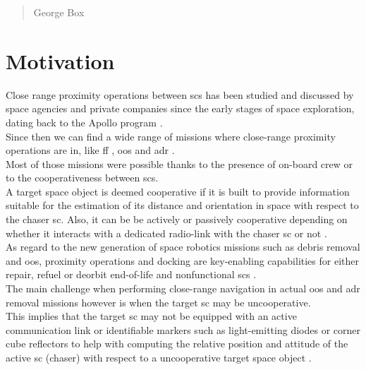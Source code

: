 \begin{quotation}
{\footnotesize
{}
\begin{flushright}
George Box
\end{flushright}
}
\end{quotation}
\vspace{0.5cm}

\section{Motivation}
Close range proximity operations between \acrfull{sc}s has been studied and discussed by space agencies and private companies since the early stages of space exploration, dating back to the Apollo program \cite{LangleyApollo}.\\
Since then we can find a wide range of missions where close-range proximity operations are in, like \acrfull{ff} \cite{2001FormationFliying}  \cite{2009FormationFliying}, \acrfull{oos} \cite{Zimpfer2005} \cite{Tatsch2006} \cite{FloresAbad2014} and \acrfull{adr} \cite{clerc2012astrium} \cite{Bonnal2013}.\\
Most of those missions were possible thanks to the presence of on-board crew or to the cooperativeness between \acrshort{sc}s.\\
A target space object is deemed cooperative if it is built to provide information suitable for the estimation of its distance and orientation in space with respect to the chaser \acrshort{sc}. Also, it can be be actively or passively cooperative depending on whether it interacts with a dedicated radio-link with the chaser \acrshort{sc} or not \cite{Opromolla2017}.\\
As regard to the new generation of space robotics missions such as debris removal and \acrshort{oos}, proximity operations and docking are key-enabling capabilities for either repair, refuel or deorbit end-of-life and nonfunctional \acrshort{sc}s \cite{2016Ventura}.\\
The main challenge when performing close-range navigation in actual \acrshort{oos} and \acrshort{adr} removal missions however is when the target \acrshort{sc} may be uncooperative.\\
This implies that the target \acrshort{sc} may not be equipped with an active communication link or identifiable markers such as light-emitting diodes or corner cube reflectors to help with computing the relative position and attitude of the active \acrshort{sc} (chaser) with respect to a uncooperative target space object \cite{2019phdSharma}.\\
